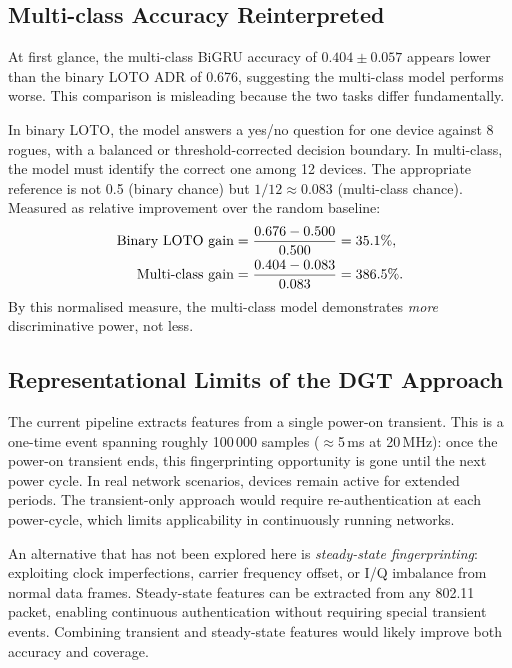 \subsection{Multi-class Accuracy Reinterpreted}

At first glance, the multi-class BiGRU accuracy of $0.404 \pm 0.057$ appears
lower than the binary LOTO ADR of 0.676, suggesting the multi-class model
performs worse.
This comparison is misleading because the two tasks differ fundamentally.

In binary LOTO, the model answers a yes/no question for one device against
8 rogues, with a balanced or threshold-corrected decision boundary.
In multi-class, the model must identify the correct one among 12 devices.
The appropriate reference is not 0.5 (binary chance) but $1/12 \approx 0.083$
(multi-class chance).
Measured as relative improvement over the random baseline:
\begin{align}
  \text{Binary LOTO gain} &= \frac{0.676 - 0.500}{0.500} = 35.1\%,\\
  \text{Multi-class gain} &= \frac{0.404 - 0.083}{0.083} = 386.5\%.
\end{align}
By this normalised measure, the multi-class model demonstrates \emph{more}
discriminative power, not less.


\subsection{Representational Limits of the DGT Approach}

The current pipeline extracts features from a single power-on transient.
This is a one-time event spanning roughly 100\,000 samples ($\approx$5\,ms
at 20\,MHz): once the power-on transient ends, this fingerprinting opportunity
is gone until the next power cycle.
In real network scenarios, devices remain active for extended periods.
The transient-only approach would require re-authentication at each
power-cycle, which limits applicability in continuously running networks.

An alternative that has not been explored here is \emph{steady-state
fingerprinting}: exploiting clock imperfections, carrier frequency offset,
or I/Q imbalance from normal data frames.
Steady-state features can be extracted from any 802.11 packet, enabling
continuous authentication without requiring special transient events.
Combining transient and steady-state features would likely improve both
accuracy and coverage.

